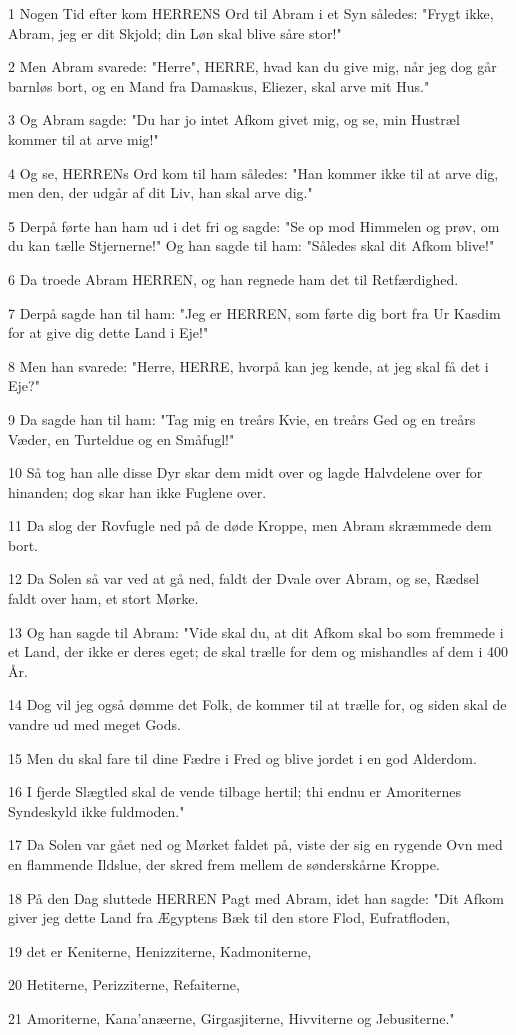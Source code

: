 \par 1 Nogen Tid efter kom HERRENS Ord til Abram i et Syn således: "Frygt ikke, Abram, jeg er dit Skjold; din Løn skal blive såre stor!"
\par 2 Men Abram svarede: "Herre", HERRE, hvad kan du give mig, når jeg dog går barnløs bort, og en Mand fra Damaskus, Eliezer, skal arve mit Hus."
\par 3 Og Abram sagde: "Du har jo intet Afkom givet mig, og se, min Hustræl kommer til at arve mig!"
\par 4 Og se, HERRENs Ord kom til ham således: "Han kommer ikke til at arve dig, men den, der udgår af dit Liv, han skal arve dig."
\par 5 Derpå førte han ham ud i det fri og sagde: "Se op mod Himmelen og prøv, om du kan tælle Stjernerne!" Og han sagde til ham: "Således skal dit Afkom blive!"
\par 6 Da troede Abram HERREN, og han regnede ham det til Retfærdighed.
\par 7 Derpå sagde han til ham: "Jeg er HERREN, som førte dig bort fra Ur Kasdim for at give dig dette Land i Eje!"
\par 8 Men han svarede: "Herre, HERRE, hvorpå kan jeg kende, at jeg skal få det i Eje?"
\par 9 Da sagde han til ham: "Tag mig en treårs Kvie, en treårs Ged og en treårs Væder, en Turteldue og en Småfugl!"
\par 10 Så tog han alle disse Dyr skar dem midt over og lagde Halvdelene over for hinanden; dog skar han ikke Fuglene over.
\par 11 Da slog der Rovfugle ned på de døde Kroppe, men Abram skræmmede dem bort.
\par 12 Da Solen så var ved at gå ned, faldt der Dvale over Abram, og se, Rædsel faldt over ham, et stort Mørke.
\par 13 Og han sagde til Abram: "Vide skal du, at dit Afkom skal bo som fremmede i et Land, der ikke er deres eget; de skal trælle for dem og mishandles af dem i 400 År.
\par 14 Dog vil jeg også dømme det Folk, de kommer til at trælle for, og siden skal de vandre ud med meget Gods.
\par 15 Men du skal fare til dine Fædre i Fred og blive jordet i en god Alderdom.
\par 16 I fjerde Slægtled skal de vende tilbage hertil; thi endnu er Amoriternes Syndeskyld ikke fuldmoden."
\par 17 Da Solen var gået ned og Mørket faldet på, viste der sig en rygende Ovn med en flammende Ildslue, der skred frem mellem de sønderskårne Kroppe.
\par 18 På den Dag sluttede HERREN Pagt med Abram, idet han sagde: "Dit Afkom giver jeg dette Land fra Ægyptens Bæk til den store Flod, Eufratfloden,
\par 19 det er Keniterne, Henizziterne, Kadmoniterne,
\par 20 Hetiterne, Perizziterne, Refaiterne,
\par 21 Amoriterne, Kana'anæerne, Girgasjiterne, Hivviterne og Jebusiterne."


